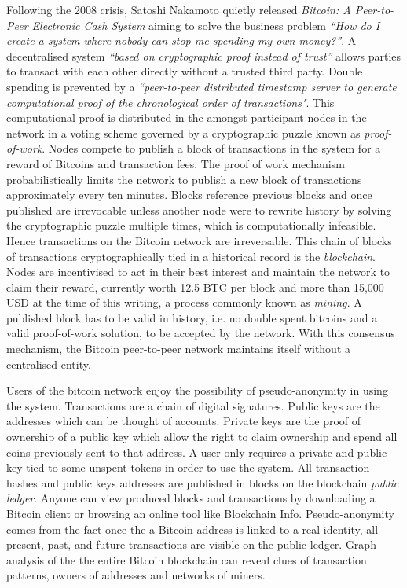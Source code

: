 \documentclass[12pt]{article} %
\begin{document}
Following the 2008 crisis, Satoshi Nakamoto quietly released \textit{Bitcoin: A Peer-to-Peer Electronic Cash System}\cite{nakamoto2008bitcoin} aiming to solve the business problem \textit{``How do I create a system where nobody can stop me spending my own money?''}\cite{brown2016introducing}. A decentralised system \textit{``based on cryptographic proof instead of trust''} allows parties to transact with each other directly without a trusted third party. Double spending is prevented by a \textit{``peer-to-peer distributed timestamp server to generate computational proof of the chronological order of transactions"}\cite{nakamoto2008bitcoin}. This computational proof is distributed in the amongst participant nodes in the network in a voting scheme governed by a cryptographic puzzle known as \textit{proof-of-work}. Nodes compete to publish a block of transactions in the system for a reward of Bitcoins and transaction fees. The proof of work mechanism probabilistically limits the network to publish a new block of transactions approximately every ten minutes. Blocks reference previous blocks and once published are irrevocable unless another node were to rewrite history by solving the cryptographic puzzle multiple times, which is computationally infeasible. Hence transactions on the Bitcoin network are irreversable. This chain of blocks of transactions cryptographically tied in a historical record is the \textit{blockchain}. Nodes are incentivised to act in their best interest and maintain the network to claim their reward, currently worth 12.5 BTC per block and more than 15,000 USD at the time of this writing, a process commonly known as \textit{mining}. A published block has to be valid in history, i.e. no double spent bitcoins and a valid proof-of-work solution, to be accepted by the network. With this consensus mechanism, the Bitcoin peer-to-peer network maintains itself without a centralised entity\cite{nakamoto2008bitcoin}.

Users of the bitcoin network enjoy the possibility of pseudo-anonymity in using the system. Transactions are a chain of digital signatures. Public keys are the addresses which can be thought of accounts. Private keys are the proof of ownership of a public key which allow the right to claim ownership and spend all coins previously sent to that address. A user only requires a private and public key tied to some unspent tokens in order to use the system\cite{nakamoto2008bitcoin}. All transaction hashes and public keys addresses are published in blocks on the blockchain \textit{public ledger}. Anyone can view produced blocks and transactions by downloading a Bitcoin client or browsing an online tool like Blockchain Info\cite{blockchaininfo}.  Pseudo-anonymity comes from the fact once the a Bitcoin address is linked to a real identity, all present, past, and future transactions are visible on the public ledger. Graph analysis of the the entire Bitcoin blockchain can reveal clues of transaction patterns, owners of addresses and networks of miners.
\end{document}
